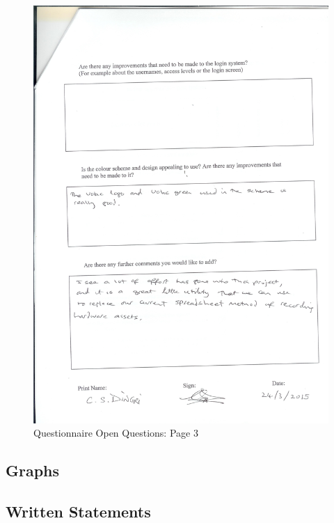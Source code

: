 \begin{figure}[H]
    \includegraphics[width=\textwidth]{./Evaluation/EvaluationQuestionnaire/Scan14.jpeg}
    \caption{Questionnaire Open Questions: Page 3} 
\end{figure}

\subsection{Graphs}

\subsection{Written Statements}
